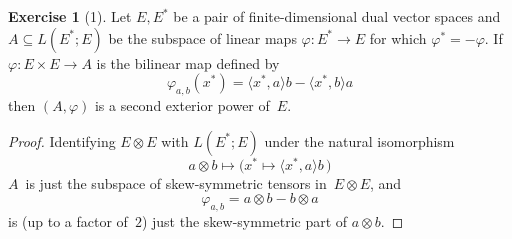 \documentclass[letterpaper,12pt]{article}
\newcommand{\tprod}{\otimes}
\newcommand{\sprod}[2]{\langle#1,#2\rangle}
\theoremstyle{definition}
\newtheorem*{exer}{Exercise}
\theoremstyle{remark}
\begin{document}
\begin{exer}[1]
Let \(E,E^*\) be a pair of finite-dimensional dual vector spaces and \(A\subseteq L(E^*;E)\) be the subspace of linear maps \(\varphi:E^*\to E\) for which \(\varphi^*=-\varphi\). If \(\varphi:E\times E\to A\) is the bilinear map defined by
\[\varphi_{a,b}(x^*)=\sprod{x^*}{a}b-\sprod{x^*}{b}a\]
then \((A,\varphi)\) is a second exterior power of~\(E\).
\end{exer}
\begin{proof}
Identifying \(E\tprod E\) with \(L(E^*;E)\) under the natural isomorphism
\[a\tprod b\mapsto\bigl(x^*\mapsto\sprod{x^*}{a}b\,\bigr)\]
\(A\)~is just the subspace of skew-symmetric tensors in~\(E\tprod E\), and
\[\varphi_{a,b}=a\tprod b-b\tprod a\]
is (up to a factor of~\(2\)) just the skew-symmetric part of \(a\tprod b\).
\end{proof}
\end{document}
